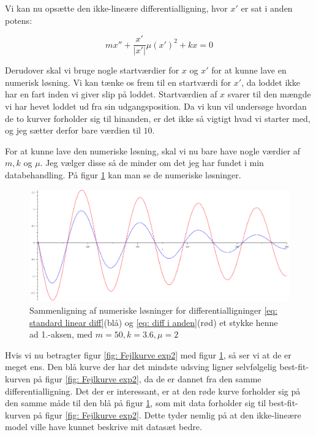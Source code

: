 Vi kan nu opsætte den ikke-lineære differentialligning, hvor $x'$ er sat i anden potens:

\begin{equation}
mx'' + \frac{x'}{|x'|} \mu  (x')^2 + kx = 0
\label{eq: diff i anden}
\end{equation}

Derudover skal vi bruge nogle startværdier for $x$ og $x'$ for at kunne lave en numerisk løsning.
Vi kan tænke os frem til en startværdi for $x'$, da loddet ikke har en fart inden vi giver slip på loddet. 
Startværdien af $x$ svarer til den mængde vi har hevet loddet ud fra sin udgangsposition. 
Da vi kun vil undersøge hvordan de to kurver forholder sig til hinanden, er det ikke så vigtigt hvad vi starter med, og jeg sætter derfor bare værdien til $10$.

For at kunne lave den numeriske løsning, skal vi nu bare have nogle værdier af $m,k$ og $\mu$. 
Jeg vælger disse så de minder om det jeg har fundet i min databehandling. 
På figur \ref{fig: numeriske solutions} kan man se de numeriske løsninger. 

\begin{figure}[h]
\centering
\includegraphics[scale=0.5]{Figurer/diffligninger}
\caption{Sammenligning af numeriske løsninger for differentialligninger \ref{eq: standard linear diff}(blå) og \ref{eq: diff i anden}(rød) et stykke henne ad 1.-aksen, med $m=50,k=3.6,\mu=2$}
\label{fig: numeriske solutions}

\end{figure}

Hvis vi nu betragter figur \ref{fig: Fejlkurve exp2} med figur \ref{fig: numeriske solutions}, så ser vi at de er meget ens. 
Den blå kurve der har det mindste udsving ligner selvfølgelig best-fit-kurven på figur \ref{fig: Fejlkurve exp2}, da de er dannet fra den samme differentialligning. 
Det der er interessant, er at den røde kurve forholder sig på den samme måde til den blå på figur \ref{fig: numeriske solutions}, som mit data forholder sig til best-fit-kurven på figur \ref{fig: Fejlkurve exp2}. 
Dette tyder nemlig på at den ikke-lineære model ville have kunnet beskrive mit datasæt bedre. 





